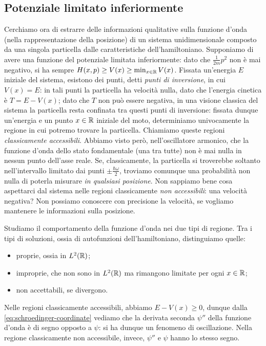 \subsection{Potenziale limitato inferiormente}
Cerchiamo ora di estrarre delle informazioni qualitative sulla funzione d'onda (nella rappresentazione della posizione) di un sistema unidimensionale composto da una singola particella dalle caratteristiche dell'hamiltoniano.
Supponiamo di avere una funzione del potenziale limitata inferiormente: dato che $\frac1{2m}p^2$ non è mai negativo, si ha sempre $H(x,p)\ge V(x)\ge\min_{x\in\mathbb{R}}V(x)$.
Fissata un'energia $E$ iniziale del sistema, esistono dei punti, detti \emph{punti di inversione}, in cui $V(x)=E$: in tali punti la particella ha velocità nulla, dato che l'energia cinetica è $T=E-V(x)$; dato che $T$ non può essere negativa, in una visione classica del sistema la particella resta confinata tra questi punti di inversione: fissata dunque un'energia e un punto $x\in\mathbb{R}$ iniziale del moto, determiniamo univocamente la regione in cui potremo trovare la particella.
Chiamiamo queste regioni \emph{classicamente accessibili}.
Abbiamo visto però, nell'oscillatore armonico, che la funzione d'onda dello stato fondamentale (una tra tutte) non è mai nulla in nessun punto dell'asse reale.
Se, classicamente, la particella si troverebbe soltanto nell'intervallo limitato dai punti $\pm\frac{\hbar\omega}2$, troviamo comunque una probabilità non nulla di poterla misurare \emph{in qualsiasi posizione}.
Non sappiamo bene cosa aspettarci dal sistema nelle regioni classicamente \emph{non accessibili}: una velocità negativa?
Non possiamo conoscere con precisione la velocità, se vogliamo mantenere le informazioni sulla posizione.

Studiamo il comportamento della funzione d'onda nei due tipi di regione.
Tra i tipi di soluzioni, ossia di autofunzioni dell'hamiltoniano, distinguiamo quelle:
\begin{itemize}
	\item proprie, ossia in $L^2(\mathbb{R})$;
	\item improprie, che non sono in $L^2(\mathbb{R})$ ma rimangono limitate per ogni $x\in\mathbb{R}$;
	\item non accettabili, se divergono.
\end{itemize}
Nelle regioni classicamente accessibili, abbiamo $E-V(x)\ge 0$, dunque dalla \eqref{eq:schroedinger-coordinate} vediamo che la derivata seconda $\psi''$ della funzione d'onda è di segno opposto a	$\psi$: si ha dunque un fenomeno di oscillazione.
Nella regione classicamente non accessibile, invece, $\psi''$ e $\psi$ hanno lo stesso segno.

